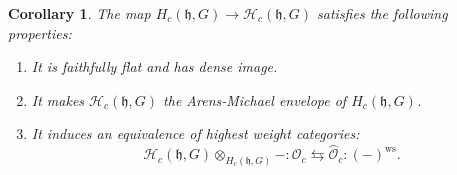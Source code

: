 \documentclass{amsart}
\newtheorem{coro}[defi]{Corollary}
\newcommand{\OX}{\mathcal{O}}
\begin{document}
\begin{coro}
The map $H_c(\mathfrak{h},G)\rightarrow \mathcal{H}_c(\mathfrak{h},G)$ satisfies the following properties:
\begin{enumerate}[label=(\roman*)]
    \item It is faithfully flat and has dense image.
    \item It makes $\mathcal{H}_c(\mathfrak{h},G)$ the Arens-Michael envelope of $H_c(\mathfrak{h},G)$.
    \item It induces an equivalence of highest weight categories:
    \begin{equation*}
        \mathcal{H}_c(\mathfrak{h},G)\otimes_{H_c(\mathfrak{h},G)}-:\OX_c\leftrightarrows \wideparen{\OX}_c: (-)^{\operatorname{ws}}.
    \end{equation*}
\end{enumerate}    
\end{coro}
\end{document}
